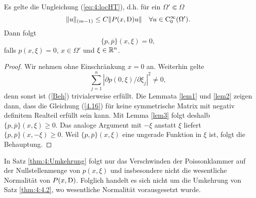 \begin{thm}
\label{thm:4:Umkehrung}
Es gelte die Ungleichung (\ref{eq:4:locHT}), d.h. für ein $\Omega'\Subset\Omega$
\begin{equation}
  \| u\|_{(m-1)} \le C \| P(x,\mathrm D) u \| \quad \forall u\in\mathrm C_0^\infty(\Omega').
\end{equation}
Dann folgt 
\begin{equation}
	\label{Beh}
\{p,\overline p\} (x,\xi) = 0,
\end{equation}
falls $p(x,\xi) = 0$, $x \in \Omega'$ und $ \xi \in \mathbb R^n$.
\end{thm}
\begin{proof}
Wir nehmen ohne Einschränkung $x=0$ an. Weiterhin gelte
\begin{equation}
\sum_{j=1}^{n}|\partial p(0,\xi)/\partial \xi_j|^2 \neq 0,
\end{equation}
denn sonst ist (\ref{Beh}) trivialerweise erfüllt. Die Lemmata \ref{lem1} und \ref{lem2} zeigen dann, dass die Gleichung (\ref{4.16}) für keine symmetrische Matrix mit negativ definitem Realteil erfüllt sein kann. Mit Lemma \ref{lem3} folgt deshalb $\{p,\overline p\}(x,\xi) \ge 0$. Das analoge Argument mit $-\xi$ anstatt $\xi$ liefert $\{p,\overline p\}(x,-\xi) \ge 0$. Weil $\{p,\overline p\}(x,\xi)$ eine ungerade Funktion in $\xi$ ist, folgt die Behauptung.
\end{proof}
\begin{rem}
In Satz \ref{thm:4:Umkehrung} folgt nur das Verschwinden der Poissonklammer auf der Nullstellenmenge von $p(x,\xi)$ und insbesondere nicht die wesentliche Normalität von $P(x,\mathrm D)$. Folglich handelt es sich nicht um die Umkehrung von Satz \ref{thm:4:4.2}, wo wesentliche Normalität vorausgesetzt wurde.
\end{rem}

